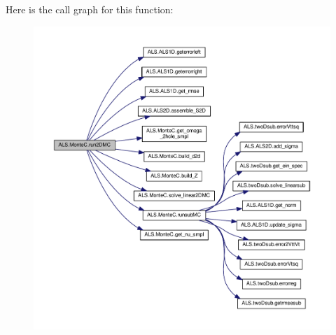 Here is the call graph for this function\+:
\nopagebreak
\begin{figure}[H]
\begin{center}
\leavevmode
\includegraphics[width=350pt]{namespace_a_l_s_1_1_monte_c_a9317dc4284f11d9f8f276424ae6b1a6f_cgraph}
\end{center}
\end{figure}


